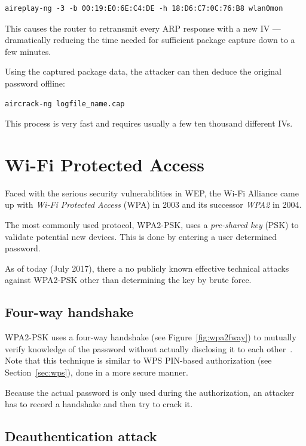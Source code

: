 \begin{lstlisting}
aireplay-ng -3 -b 00:19:E0:6E:C4:DE -h 18:D6:C7:0C:76:B8 wlan0mon
\end{lstlisting}

This causes the router to retransmit every ARP response with a new IV --- dramatically reducing the time needed for sufficient package capture down to a few minutes.

Using the captured package data, the attacker can then deduce the original password offline:

\begin{lstlisting}
aircrack-ng logfile_name.cap
\end{lstlisting}

This process is very fast and requires usually a few ten thousand different IVs.

\section{Wi-Fi Protected Access}

Faced with the serious security vulnerabilities in WEP, the Wi-Fi Alliance came up with \emph{Wi-Fi Protected Access} (WPA) in 2003 and its successor \emph{WPA2} in 2004.

The most commonly used protocol, WPA2-PSK, uses a \emph{pre-shared key} (PSK) to validate potential new devices. This is done by entering a user determined password.

As of today (July 2017), there a no publicly known effective technical attacks against WPA2-PSK other than determining the key by brute force.

\subsection{Four-way handshake}\label{sec:wpa2handshake}

WPA2-PSK uses a four-way handshake (see Figure~\ref{fig:wpa2fway}) to mutually verify knowledge of the password without actually disclosing it to each other~\cite{WiFi16}. Note that this technique is similar to WPS PIN-based authorization (see Section~\ref{sec:wps}), done in a more secure manner.

Because the actual password is only used during the authorization, an attacker has to record a handshake and then try to crack it.

\subsection{Deauthentication attack}\label{sec:deauth}

